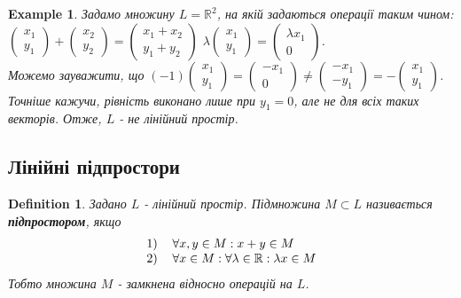\documentclass[a4paper, 10pt]{article}
\theoremstyle{theoremdd}
\newtheorem{definition}[theorem]{Definition}
\newtheorem{example}[theorem]{Example}
\begin{document}
	\begin{example}
	Задамо множину $L = \mathbb{R}^2$, на якій задаються операції таким чином:\\
	$\begin{pmatrix}
	x_1 \\ y_1
	\end{pmatrix} + \begin{pmatrix}
	x_2 \\ y_2
	\end{pmatrix} = \begin{pmatrix}
	x_1 + x_2 \\ y_1+y_2
	\end{pmatrix}$ \quad $\lambda \begin{pmatrix}
	x_1 \\ y_1
	\end{pmatrix} = \begin{pmatrix}
	\lambda x_1 \\ 0
	\end{pmatrix}$.\\
	Можемо зауважити, що $(-1) \begin{pmatrix}
	x_1 \\ y_1
	\end{pmatrix} = \begin{pmatrix}
	-x_1 \\ 0
	\end{pmatrix} \neq \begin{pmatrix}
	-x_1 \\ -y_1
	\end{pmatrix} = - \begin{pmatrix}
	x_1 \\ y_1
	\end{pmatrix}$. Точніше кажучи, рівність виконано лише при $y_1 = 0$, але не для всіх таких векторів. Отже, $L$ - не лінійний простір.
	\end{example}
	
	\subsection{Лінійні підпростори}
	\begin{definition}
	Задано $L$ - лінійний простір.
	Підмножина $M \subset L$ називається \textbf{підпростором}, якщо
	\begin{align*}
	\begin{tabular}{cl}
	1) & $\forall x, y \in M: x + y \in M$\\
	2) & $\forall x \in M: \forall \lambda \in \mathbb{R}: \lambda x \in M$\\
	\end{tabular}
	\end{align*}
	Тобто множина $M$ - замкнена відносно операцій на $L$.
	\end{definition}
	
\end{document}
